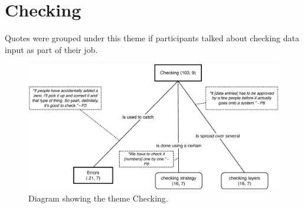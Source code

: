 \section{Checking}\label{subsec:Checking}
Quotes were grouped under this theme if participants talked about checking data input as part of their job. 

\begin{figure}[!ht]
\centering
\includegraphics[width=\textwidth]{images/ch12/Checking.pdf}
\caption[Study 1 Checking diagram]{Diagram showing the theme Checking.}
\vspace{-9pt}
\label{fig:ch3_checking}
\end{figure}

\newpage

